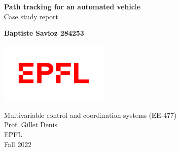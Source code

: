 \begin{titlepage}
    \begin{center}

        \Huge
        \textbf{Path tracking for an automated vehicle}\\
        \vspace{0.3cm}
        Case study report
        \vspace{0.5cm}
        \LARGE
        
            
        \vspace{1.5cm}

        \textbf{Baptiste Savioz 284253}\\

        \vfill
            
            
        \vspace{0.8cm}
        
        \includegraphics[width=0.4\textwidth]{Latex report/image/epfl.png}
        
        \Large
        Multivariable control and coordination systems (EE-477)\\
        Prof. Gillet Denis\\
        EPFL\\
        Fall 2022
            
    \end{center}
\end{titlepage}